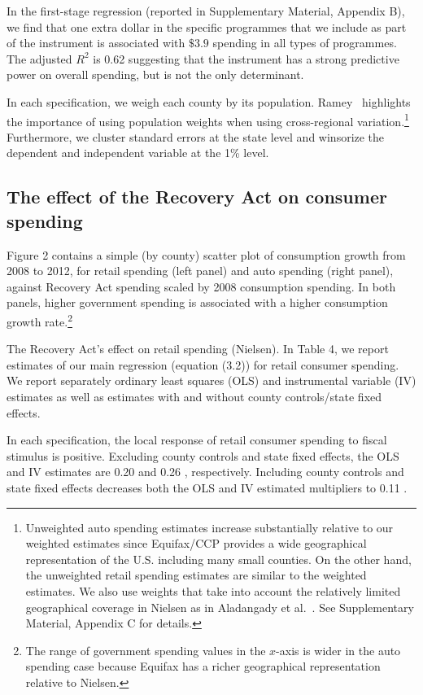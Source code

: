\documentclass[\latexroot/\projectname]{subfiles}
\begin{document}
In the first-stage regression (reported in Supplementary Material, Appendix B), we find that one extra dollar in the specific programmes that we include as part of the instrument is associated with $\$ 3.9$ spending in all types of programmes. The adjusted $R^{2}$ is 0.62 suggesting that the instrument has a strong predictive power on overall spending, but is not the only determinant.

In each specification, we weigh each county by its population. Ramey~\cite{Ramey2019-go} highlights the importance of using population weights when using cross-regional variation.\footnote{Unweighted auto spending estimates increase substantially relative to our weighted estimates since Equifax/CCP provides a wide geographical representation of the U.S. including many small counties. On the other hand, the unweighted retail spending estimates are similar to the weighted estimates. We also use weights that take into account the relatively limited geographical coverage in Nielsen as in Aladangady et al.~\cite{Aladangady2017-zu}. See Supplementary Material, Appendix C for details.} Furthermore, we cluster standard errors at the state level and winsorize the dependent and independent variable at the 1\% level.

\subsection{The effect of the Recovery Act on consumer spending}
Figure 2 contains a simple (by county) scatter plot of consumption growth from 2008 to 2012, for retail spending (left panel) and auto spending (right panel), against Recovery Act spending scaled by 2008 consumption spending. In both panels, higher government spending is associated with a higher consumption growth rate.\footnote{The range of government spending values in the $x$-axis is wider in the auto spending case because Equifax has a richer geographical representation relative to Nielsen.}

The Recovery Act's effect on retail spending (Nielsen). In Table 4, we report estimates of our main regression (equation (3.2)) for retail consumer spending. We report separately ordinary least squares (OLS) and instrumental variable (IV) estimates as well as estimates with and without county controls/state fixed effects.

In each specification, the local response of retail consumer spending to fiscal stimulus is positive. Excluding county controls and state fixed effects, the OLS and IV estimates are 0.20 and 0.26 , respectively. Including county controls and state fixed effects decreases both the OLS and IV estimated multipliers to 0.11 .
\end{document}
